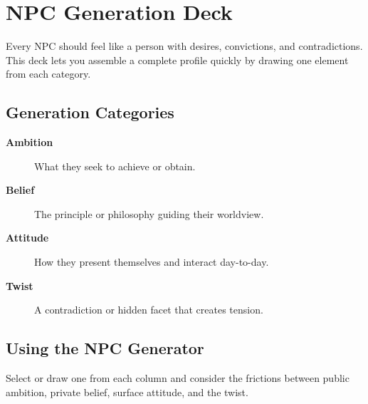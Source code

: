 \section{NPC Generation Deck}
\label{sec:npc-generation}

Every NPC should feel like a person with desires, convictions, and contradictions. This deck lets you assemble a complete profile quickly by drawing one element from each category.

\subsection{Generation Categories}
\label{subsec:npc-categories}

\begin{description}
\item[\textbf{Ambition}] What they seek to achieve or obtain. 
\item[\textbf{Belief}] The principle or philosophy guiding their worldview. 
\item[\textbf{Attitude}] How they present themselves and interact day-to-day. 
\item[\textbf{Twist}] A contradiction or hidden facet that creates tension. 
\end{description}

\subsection{Using the NPC Generator}
\label{subsec:npc-usage}

Select or draw one from each column and consider the frictions between public ambition, private belief, surface attitude, and the twist.

